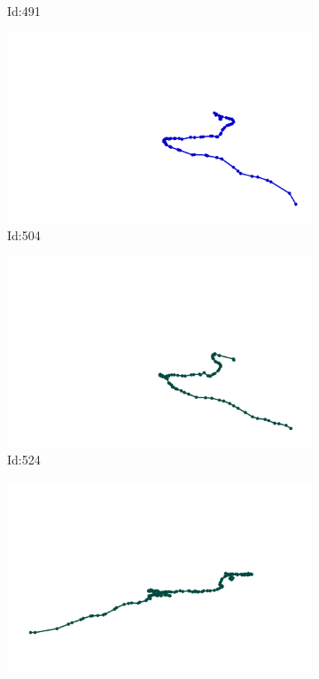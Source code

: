 \documentclass[12pt,twoside]{report}
\begin{document}
\begin{figure}
\begin{subfigure}[b]{0.20\textwidth}
\caption{Id:491}
\end{subfigure}
\begin{subfigure}[b]{0.20\textwidth}
\centering
\includegraphics[width=\textwidth]{../trajectories/504.png}
\caption{Id:504}
\end{subfigure}
\begin{subfigure}[b]{0.20\textwidth}
\centering
\includegraphics[width=\textwidth]{../trajectories/524.png}
\caption{Id:524}
\end{subfigure}
\begin{subfigure}[b]{0.20\textwidth}
\centering
\includegraphics[width=\textwidth]{../trajectories/538.png}

\end{subfigure}
\end{figure}
\end{document}
